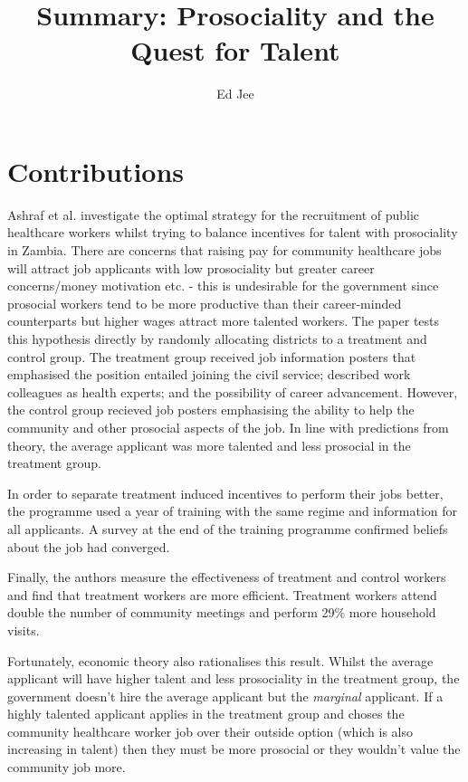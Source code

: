 \documentclass{article}
\author{Ed Jee}
\title{Summary: Prosociality and the Quest for Talent}
\begin{document}
\maketitle 


\section*{Contributions}


Ashraf et al. investigate the optimal strategy for the recruitment of public 
healthcare workers whilst trying to balance incentives for talent with prosociality 
in Zambia.
There are concerns that raising pay for community healthcare jobs will attract job applicants 
with low prosociality but greater career concerns/money motivation etc. - this 
is undesirable for the government since prosocial workers tend to be more 
productive than their career-minded counterparts but higher wages attract 
more talented workers. The paper tests this 
hypothesis directly by randomly allocating districts to a treatment and control 
group. The treatment group received job information posters that emphasised the 
position entailed joining the civil service; described work colleagues as 
health experts; and the possibility of career advancement. However, the control 
group recieved job posters emphasising the ability to help the community and 
other prosocial aspects of the job. In line with predictions from theory, 
the average applicant was more talented and less prosocial in the treatment 
group.


In order to separate treatment induced incentives to perform their jobs better, 
the programme used a year of training with the same regime and information for all applicants.
A survey at the end of the training programme confirmed beliefs about the job 
had converged.


Finally, the authors measure the effectiveness of treatment and control workers 
and find that treatment workers are more efficient. Treatment workers attend 
double the number of community meetings and perform 29\% more household visits.


Fortunately, economic theory also rationalises this result. Whilst the average 
applicant will have higher talent and less prosociality in the treatment group, 
the government doesn't hire the average applicant but the \textit{marginal} 
applicant. If a highly talented applicant applies in the treatment group and 
choses the community healthcare worker job over their outside option (which is 
also increasing in talent) then they must be more prosocial or they wouldn't 
value the community job more.
\end{document}
